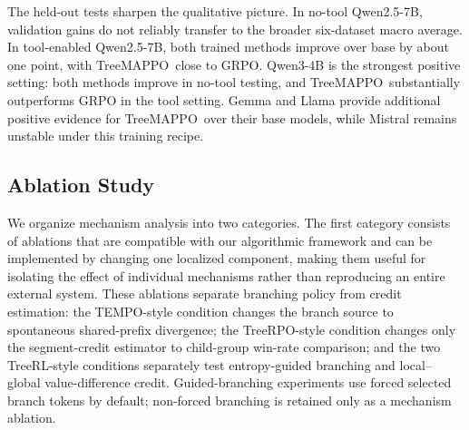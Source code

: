 \documentclass{article}
\newcommand{\ours}{TreeMAPPO\xspace}
\begin{document}
The held-out tests sharpen the qualitative picture. In no-tool Qwen2.5-7B, validation gains do not reliably transfer to the broader six-dataset macro average. In tool-enabled Qwen2.5-7B, both trained methods improve over base by about one point, with \ours\ close to GRPO. Qwen3-4B is the strongest positive setting: both methods improve in no-tool testing, and \ours\ substantially outperforms GRPO in the tool setting. Gemma and Llama provide additional positive evidence for \ours\ over their base models, while Mistral remains unstable under this training recipe.

\subsection{Ablation Study}
We organize mechanism analysis into two categories. The first category consists of ablations that are compatible with our algorithmic framework and can be implemented by changing one localized component, making them useful for isolating the effect of individual mechanisms rather than reproducing an entire external system. These ablations separate branching policy from credit estimation: the TEMPO-style condition changes the branch source to spontaneous shared-prefix divergence; the TreeRPO-style condition changes only the segment-credit estimator to child-group win-rate comparison; and the two TreeRL-style conditions separately test entropy-guided branching and local--global value-difference credit. Guided-branching experiments use forced selected branch tokens by default; non-forced branching is retained only as a mechanism ablation.
\end{document}
